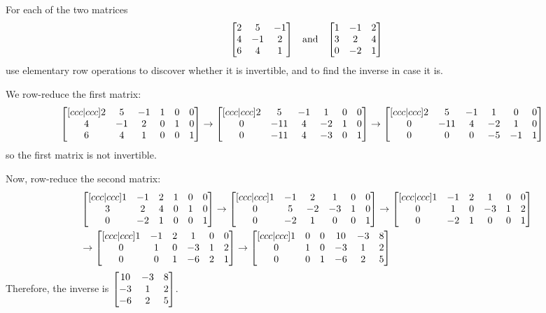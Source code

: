 \documentclass[notes]{agony}
\begin{document}
\begin{xca}
  For each of the two matrices
  \[ \mqty[2&5&-1\\4&-1&2\\6&4&1] \qand \mqty[1&-1&2\\3&2&4\\0&-2&1] \]
  use elementary row operations to discover whether it is invertible,
  and to find the inverse in case it is.
\end{xca}
\begin{sol}
  We row-reduce the first matrix:
  \begin{equation*}
    \begin{split}
      & \bmqty[ccc|ccc]{2&5&-1 & 1&0&0 \\ 4&-1&2 & 0&1&0 \\ 6&4&1 & 0&0&1}
      \to \bmqty[ccc|ccc]{2&5&-1 & 1&0&0 \\ 0&-11&4 & -2&1&0 \\ 0&-11&4 & -3&0&1}
      \to \bmqty[ccc|ccc]{2&5&-1 & 1&0&0 \\ 0&-11&4 & -2&1&0 \\ 0&0&0 & -5&-1&1}
    \end{split}
  \end{equation*}
  so the first matrix is not invertible.

  Now, row-reduce the second matrix:
  \begin{equation*}
    \begin{split}
      & \bmqty[ccc|ccc]{1&-1&2 & 1&0&0 \\ 3&2&4 & 0&1&0 \\ 0&-2&1 & 0&0&1}
      \to \bmqty[ccc|ccc]{1&-1&2 & 1&0&0 \\ 0&5&-2 & -3&1&0 \\ 0&-2&1 & 0&0&1}
      \to \bmqty[ccc|ccc]{1&-1&2 & 1&0&0 \\ 0&1&0 & -3&1&2 \\ 0&-2&1 & 0&0&1} \\
      & \to \bmqty[ccc|ccc]{1&-1&2 & 1&0&0 \\ 0&1&0 & -3&1&2 \\ 0&0&1 & -6&2&1}
      \to \bmqty[ccc|ccc]{1&0&0 & 10&-3&8 \\ 0&1&0 & -3&1&2 \\ 0&0&1 & -6&2&5}
    \end{split}
  \end{equation*}
  Therefore, the inverse is $\mqty[10&-3&8 \\ -3&1&2 \\ -6&2&5]$.
\end{sol}
\end{document}

